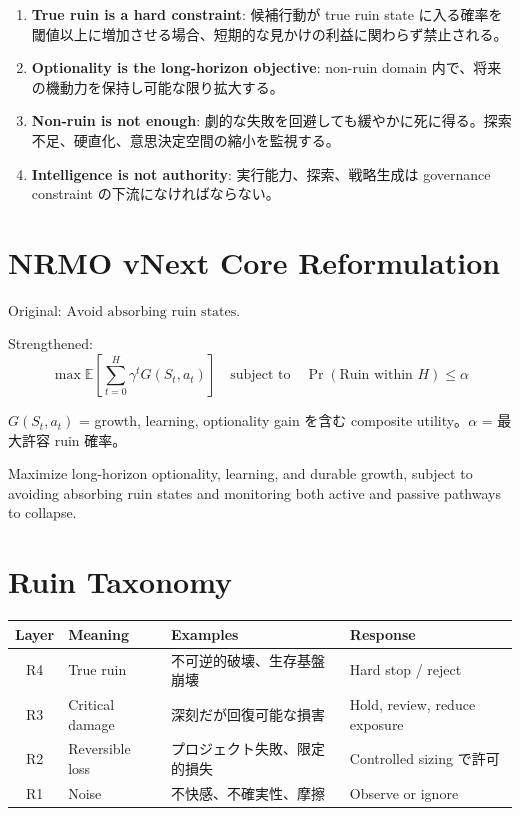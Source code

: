 \documentclass[11pt,a4paper]{article}
\theoremstyle{definition}\newtheorem{definition}{Definition}[section]
\begin{document}
\begin{enumerate}[leftmargin=2em]
  \item \textbf{True ruin is a hard constraint}: 候補行動が true ruin state に入る確率を閾値以上に増加させる場合、短期的な見かけの利益に関わらず禁止される。
  \item \textbf{Optionality is the long-horizon objective}: non-ruin domain 内で、将来の機動力を保持し可能な限り拡大する。
  \item \textbf{Non-ruin is not enough}: 劇的な失敗を回避しても緩やかに死に得る。探索不足、硬直化、意思決定空間の縮小を監視する。
  \item \textbf{Intelligence is not authority}: 実行能力、探索、戦略生成は governance constraint の下流になければならない。
\end{enumerate}


\section{NRMO vNext Core Reformulation}

Original: $\text{Avoid absorbing ruin states.}$

Strengthened:
\begin{equation}
\boxed{\max \mathbb{E}\left[\sum_{t=0}^{H}\gamma^t G(S_t,a_t)\right] \quad \text{subject to} \quad \Pr(\text{Ruin within } H) \leq \alpha}
\end{equation}

$G(S_t,a_t)$ = growth, learning, optionality gain を含む composite utility。$\alpha$ = 最大許容 ruin 確率。

\begin{principle}
Maximize long-horizon optionality, learning, and durable growth, subject to avoiding absorbing ruin states and monitoring both active and passive pathways to collapse.
\end{principle}


\section{Ruin Taxonomy}

\begin{table}[H]\centering\small
\begin{tabular}{@{}clp{5cm}p{3.5cm}@{}}\toprule
Layer&Meaning&Examples&Response\\\midrule
R4&True ruin&不可逆的破壊、生存基盤崩壊&Hard stop / reject\\
R3&Critical damage&深刻だが回復可能な損害&Hold, review, reduce exposure\\
R2&Reversible loss&プロジェクト失敗、限定的損失&Controlled sizing で許可\\
R1&Noise&不快感、不確実性、摩擦&Observe or ignore\\
\bottomrule\end{tabular}
\end{table}
\end{document}

